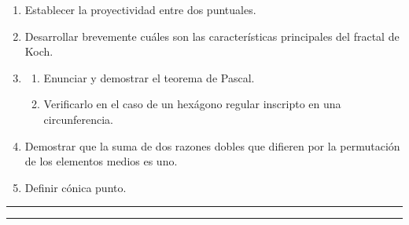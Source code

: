 \documentclass[9pt,a4paper]{extarticle}
\begin{document}
\begin{enumerate}

\item Establecer la proyectividad entre dos puntuales.

\item Desarrollar brevemente cuáles son las características principales del fractal de Koch.

\item
\begin{enumerate}
    \item Enunciar y demostrar el teorema de Pascal. 
    \item Verificarlo en el caso de un hexágono regular inscripto en una circunferencia.
\end{enumerate}

\item Demostrar que la suma de dos razones dobles que difieren por la permutación de los elementos medios es uno.

\item Definir cónica punto.

\end{enumerate}
\hrule
\newpage
\hrule
{}
\end{document}
